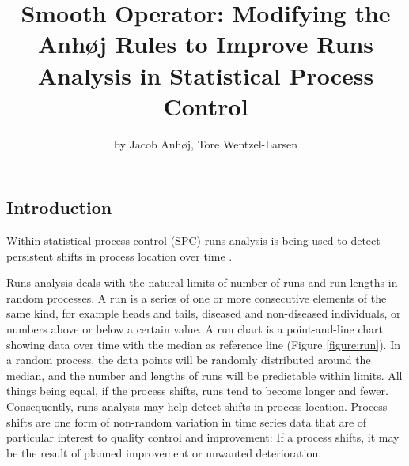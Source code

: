 \title{Smooth Operator: Modifying the Anhøj Rules to Improve Runs Analysis in
Statistical Process Control}
\author{by Jacob Anhøj, Tore Wentzel-Larsen}

\maketitle



\hypertarget{introduction}{%
\subsection{Introduction}\label{introduction}}

Within statistical process control (SPC) runs analysis is being used to
detect persistent shifts in process location over time
\citep{anhoej2018}.

Runs analysis deals with the natural limits of number of runs and run
lengths in random processes. A run is a series of one or more
consecutive elements of the same kind, for example heads and tails,
diseased and non-diseased individuals, or numbers above or below a
certain value. A run chart is a point-and-line chart showing data over
time with the median as reference line (Figure \ref{figure:run}). In a
random process, the data points will be randomly distributed around the
median, and the number and lengths of runs will be predictable within
limits. All things being equal, if the process shifts, runs tend to
become longer and fewer. Consequently, runs analysis may help detect
shifts in process location. Process shifts are one form of non-random
variation in time series data that are of particular interest to quality
control and improvement: If a process shifts, it may be the result of
planned improvement or unwanted deterioration.

